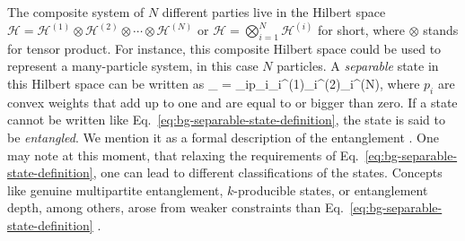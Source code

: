 The composite system of $N$ different parties live in the Hilbert space $\mathcal{H} = \mathcal{H}^{(1)}\otimes\mathcal{H}^{(2)}\otimes\cdots\otimes\mathcal{H}^{(N)}$ or $\mathcal{H} = \bigotimes_{i=1}^N\mathcal{H}^{(i)}$ for short, where $\otimes$ stands for tensor product.
For instance, this composite Hilbert space could be used to represent a many-particle system, in this case $N$ particles.
A \emph{separable} state in this Hilbert space can be written as
\be
  \label{eq:bg-separable-state-definition}
  \rho_{} = \sum_{i}p_i\rho_i^{(1)}\otimes\rho_i^{(2)}\otimes\cdots\otimes\rho_i^{(N)},
\ee
where $p_i$ are convex weights that add up to one and are equal to or bigger than zero.
If a state cannot be written like Eq.~\eqref{eq:bg-separable-state-definition}, the state is said to be \emph{entangled}.
We mention it as a formal description of the entanglement \cite{Guehne2009, Luis2004}.
One may note at this moment, that relaxing the requirements of Eq.~\eqref{eq:bg-separable-state-definition}, one can lead to different classifications of the states.
Concepts like genuine multipartite entanglement, $k$-producible states, or entanglement depth, among others, arose from weaker constraints than Eq.~\eqref{eq:bg-separable-state-definition} \cite{Guehne2009, Luis2004}.

